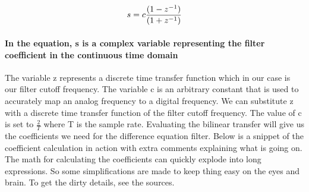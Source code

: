 \documentclass[acmlarge,screen]{acmart}
\begin{document}
	\begin{equation}
		\large
		s=c\frac{(1-z^{-1})}{(1+z^{-1})}
		\label{eq:bilinear}
	\end{equation}
	
	\paragraph{In the equation, s is a complex variable representing the filter coefficient in the continuous time domain} The variable z represents a discrete time transfer function which in our case is our filter cutoff frequency. The variable c is an arbitrary constant that is used to accurately map an analog frequency to a digital frequency. We can substitute z with a discrete time transfer function of the  filter cutoff frequency. The value of c is set to \( \frac{2}{T} \) where T is the sample rate. Evaluating the bilinear transfer will give us the coefficients we need for the difference equation filter. Below is a snippet of the coefficient calculation in action with extra comments explaining what is going on. The math for calculating the coefficients can quickly explode into long expressions. So some simplifications are made to keep thing easy on the eyes and brain. To get the dirty details, see the sources.
	
\end{document}

